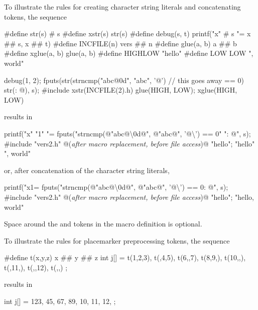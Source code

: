 \pnum
\begin{example}
To illustrate the rules for creating character string literals
and concatenating tokens,
the sequence

\begin{codeblock}
#define str(s)      # s
#define xstr(s)     str(s)
#define debug(s, t) printf("x" # s "= %
               x ## s, x ## t)
#define INCFILE(n)  vers ## n
#define glue(a, b)  a ## b
#define xglue(a, b) glue(a, b)
#define HIGHLOW     "hello"
#define LOW         LOW ", world"

debug(1, 2);
fputs(str(strncmp("abc@\textbackslash@0d", "abc", '@')        // this goes away
    == 0) str(: @\atsign\textbackslash@n), s);
#include xstr(INCFILE(2).h)
glue(HIGH, LOW);
xglue(HIGH, LOW)
\end{codeblock}

results in

\begin{codeblock}
printf("x" "1" "= %
fputs("strncmp(@\textbackslash@"abc@\textbackslash\textbackslash@0d@\textbackslash@", @\textbackslash@"abc@\textbackslash@", '@\textbackslash{}') == 0" ": @\atsign\textbackslash@n", s);
#include "vers2.h"      @\textrm{(\textit{after macro replacement, before file access})}@
"hello";
"hello" ", world"
\end{codeblock}

or, after concatenation of the character string literals,

\begin{codeblock}
printf("x1= %
fputs("strncmp(@\textbackslash@"abc@\textbackslash\textbackslash@0d@\textbackslash@", @\textbackslash@"abc@\textbackslash@", '@\textbackslash{}') == 0: @\atsign\textbackslash@n", s);
#include "vers2.h"      @\textrm{(\textit{after macro replacement, before file access})}@
"hello";
"hello, world"
\end{codeblock}

Space around the
\tcode{\#}
and
\tcode{\#\#}
tokens in the macro definition is optional.
\end{example}

\pnum
\begin{example}
To illustrate the rules for placemarker preprocessing tokens, the sequence

\begin{codeblock}
#define t(x,y,z) x ## y ## z
int j[] = { t(1,2,3), t(,4,5), t(6,,7), t(8,9,),
  t(10,,), t(,11,), t(,,12), t(,,) };
\end{codeblock}

results in

\begin{codeblock}
int j[] = { 123, 45, 67, 89,
  10, 11, 12, };
\end{codeblock}
\end{example}

